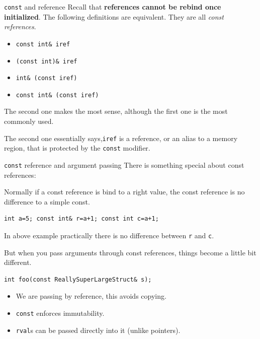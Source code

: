 \begin{frame}{\texttt{const} and reference}
Recall that \textbf{references cannot be rebind once initialized}. The following definitions are equivalent. They are all \textit{const references}.

\begin{itemize}
	\item \texttt{const int\& iref}
	\item \texttt{(const int)\& iref}
	\item \texttt{int\& (const iref)}
	\item \texttt{const int\& (const iref)}
\end{itemize}

The second one makes the most sense, although the first one is the most commonly used. 

The second one essentially says,\texttt{iref} is a reference, or an alias to a memory region, that is protected by the \texttt{const} modifier. 
\end{frame}

\begin{frame}[fragile]{\texttt{const} reference and argument passing}
There is something special about const references:
\begin{center}
\end{center}
Normally if a const reference is bind to a right value, the const reference is no difference to a simple const. 
\begin{verbatim}
int a=5; const int& r=a+1; const int c=a+1;
\end{verbatim}
In above example practically there is no difference between \texttt{r} and \texttt{c}.

But when you pass arguments through const references, things become a little bit different.
\begin{verbatim}
int foo(const ReallySuperLargeStruct& s);
\end{verbatim}
\vspace{-0.05in}
\begin{itemize}
	\item We are passing by reference, this avoids copying.
	\item \texttt{const} enforces immutability.
	\item \texttt{rval}s can be passed directly into it (unlike pointers).
\end{itemize}
\end{frame}

